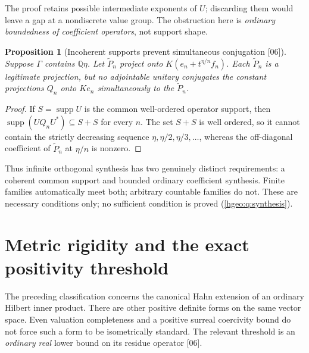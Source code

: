 \documentclass[11pt,letterpaper]{article}
\numberwithin{equation}{section}
\newtheorem{proposition}[proposition]{Proposition}
\theoremstyle{definition}
\theoremstyle{remark}
\newcommand{\Q}{\mathbb Q}
\newcommand{\K}{K}
\newcommand{\supp}{\operatorname{supp}}
\newcommand{\src}[1]{\textup{\textsf{\small[#1]}}}
\begin{document}
The proof retains possible intermediate exponents of $U$; discarding them
would leave a gap at a nondiscrete value group. The obstruction here is
\emph{ordinary boundedness of coefficient operators}, not support shape.

\begin{proposition}[Incoherent supports prevent simultaneous conjugation
\src{06}]\label{hgeo:prop:incoherent}
Suppose $\Gamma$ contains $\Q\eta$. Let $\widetilde P_n$ project onto
$\K(e_n+t^{\eta/n}f_n)$. Each $\widetilde P_n$ is a legitimate projection,
but no adjointable unitary conjugates the constant projections $Q_n$ onto
$\K e_n$ simultaneously to the $\widetilde P_n$.
\end{proposition}
\begin{proof}
If $S=\supp U$ is the common well-ordered operator support, then
$\supp(UQ_nU^*)\subseteq S+S$ for every $n$. The set $S+S$ is well
ordered, so it cannot contain the strictly decreasing sequence
$\eta,\eta/2,\eta/3,\ldots$, whereas the off-diagonal coefficient of
$\widetilde P_n$ at $\eta/n$ is nonzero.
\end{proof}

Thus infinite orthogonal synthesis has two genuinely distinct requirements:
a coherent common support and bounded ordinary coefficient synthesis.
Finite families automatically meet both; arbitrary countable families do
not. These are necessary conditions only; no sufficient condition is proved
(\cref{hgeo:q:synthesis}).

\section{Metric rigidity and the exact positivity threshold}
\label{hgeo:sec:metric}

The preceding classification concerns the canonical Hahn extension of an
ordinary Hilbert inner product. There are other positive definite forms on
the same vector space. Even valuation completeness and a positive surreal
coercivity bound do not force such a form to be isometrically standard. The
relevant threshold is an \emph{ordinary real} lower bound on its residue
operator \src{06}.
\end{document}
